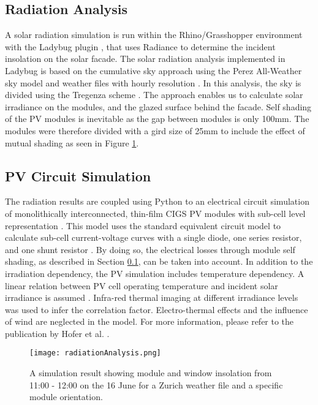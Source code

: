 \subsection{Radiation Analysis}
\label{ch:rad}
A solar radiation simulation is run within the Rhino/Grasshopper environment \cite{grasshopper} with the Ladybug plugin \cite{roudsari2013ladybug},  that uses Radiance \cite{ward1994radiance} to determine the incident insolation on the solar facade. The solar radiation analysis implemented in Ladybug is based on the cumulative sky approach \cite{robinson2004irradiation} using the Perez All-Weather sky model and weather files with hourly resolution \cite{perez1993all}. In this analysis, the sky is divided using the Tregenza scheme \cite{tregenza1987subdivision}. The approach enables us to calculate solar irradiance on the modules, and the glazed surface behind the facade. Self shading of the PV modules is inevitable as the gap between modules is only 100mm. The modules were therefore divided with a gird size of 25mm to include the effect of mutual shading as seen in Figure \ref{fig:radiation2}.
  

\subsection{PV Circuit Simulation}

The radiation results are coupled using Python to an electrical circuit simulation of monolithically interconnected, thin-film CIGS PV modules with sub-cell level representation \cite{hofer2016parametric,python}. This model uses the standard equivalent circuit model to calculate sub-cell current-voltage curves with a single diode, one series resistor, and one shunt resistor \cite{mermoud2010}. By doing so, the electrical losses through module self shading, as described in Section \ref{ch:rad}, can be taken into account. In addition to the irradiation dependency, the PV simulation includes temperature dependency. A linear relation between PV cell operating temperature and incident solar irradiance is assumed \cite{skoplaki2009operating}. Infra-red thermal imaging at different irradiance levels was used to infer the correlation factor. Electro-thermal effects and the influence of wind are neglected in the model. For more information, please refer to the publication by Hofer et al. \cite{hofer2016parametric}.


\begin{figure}
\begin{center}
\texttt{[image: radiationAnalysis.png]}
\caption{A simulation result showing module and window insolation from 11:00 - 12:00 on the 16 June for a Zurich weather file and a specific module orientation.}
\label{fig:radiation2}
\end{center}
\end{figure}


